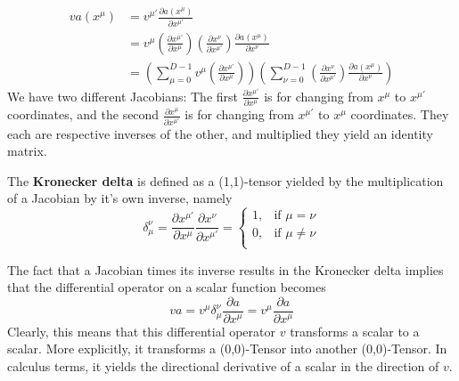 \documentclass{article}
\begin{document}
 			\begin{align*}
 				v a(x^\mu) &= v^{\mu'} \frac{\partial a (x^\mu)}{\partial x^{\mu'}} \\
 				&= v^{\mu} \left(\frac{\partial x^{\mu'}}{\partial x^\mu}\right) \left(\frac{\partial x^{\nu}}{\partial x^{\mu'}}\right) \frac{\partial a(x^{\mu})}{\partial x^\nu} \\
 				&= \left( \sum_{\mu=0}^{D-1} v^{\mu} \left(\frac{\partial x^{\mu'}}{\partial x^\mu}\right) \right) \left( \sum_{\nu=0}^{D-1} \left(\frac{\partial x^{\nu}}{\partial x^{\mu'}}\right)  \frac{\partial a(x^{\mu})}{\partial x^\nu} \right)
 			\end{align*}
 			We have two different Jacobians: The first $\frac{\partial x^{\mu'}}{\partial x^\mu}$ is for changing from $x^\mu$ to $x^{\mu'}$ coordinates, and the second $\frac{\partial x^{\mu}}{\partial x^{\mu'}}$ is for changing from $x^{\mu'}$ to $x^\mu$ coordinates. They each are respective inverses of the other, and multiplied they yield an identity matrix.
 			
 			\begin{defn}
 				The \textbf{Kronecker delta} is defined as a (1,1)-tensor yielded by the multiplication of a Jacobian by it's own inverse, namely
 				\begin{equation}
 					\label{eq:KroneckerDelta}
 					\boxed{\delta_{\mu}^\nu = \frac{\partial x^{\mu'}}{\partial x^\mu}\frac{\partial x^{\nu}}{\partial x^{\mu'}} = \begin{cases}
 							1, & \text{if } \mu = \nu \\
 							0, & \text{if } \mu \neq \nu \\
 					\end{cases}}
 				\end{equation}
 			\end{defn}
 		
 			The fact that a Jacobian times its inverse results in the Kronecker delta implies that the differential operator on a scalar function becomes
 			$$ va = v^\mu \delta_\mu^\nu \frac{\partial a}{\partial x^\mu} = v^\mu \frac{\partial a}{\partial x^\mu}$$
 			Clearly, this means that this differential operator $v$ transforms a scalar to a scalar. More explicitly, it transforms a (0,0)-Tensor into another (0,0)-Tensor. In calculus terms, it yields the directional derivative of a scalar in the direction of $v$.
 			
\end{document}
